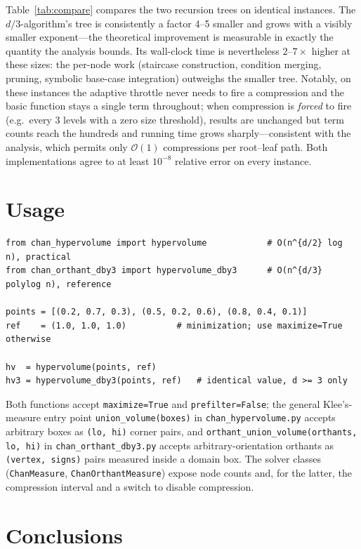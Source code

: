 \documentclass[11pt,a4paper]{article}
\theoremstyle{remark}
\newcommand{\Oh}{\mathcal{O}}
\begin{document}
Table~\ref{tab:compare} compares the two recursion trees on identical
instances.  The $d/3$-algorithm's tree is consistently a factor 4--5 smaller
and grows with a visibly smaller exponent---the theoretical improvement is
measurable in exactly the quantity the analysis bounds.  Its wall-clock time
is nevertheless $2$--$7\times$ higher at these sizes: the per-node work
(staircase construction, condition merging, pruning, symbolic base-case
integration) outweighs the smaller tree.  Notably, on these instances the
adaptive throttle never needs to fire a compression and the basic function
stays a single term throughout; when compression is \emph{forced} to fire
(e.g.\ every 3 levels with a zero size threshold), results are unchanged but
term counts reach the hundreds and running time grows sharply---consistent
with the analysis, which permits only $\Oh(1)$ compressions per root--leaf
path.  Both implementations agree to at least $10^{-8}$ relative error on
every instance.

\section{Usage}

\begin{lstlisting}
from chan_hypervolume import hypervolume            # O(n^{d/2} log n), practical
from chan_orthant_dby3 import hypervolume_dby3      # O(n^{d/3} polylog n), reference

points = [(0.2, 0.7, 0.3), (0.5, 0.2, 0.6), (0.8, 0.4, 0.1)]
ref    = (1.0, 1.0, 1.0)          # minimization; use maximize=True otherwise

hv  = hypervolume(points, ref)
hv3 = hypervolume_dby3(points, ref)   # identical value, d >= 3 only
\end{lstlisting}

\noindent Both functions accept \texttt{maximize=True} and
\texttt{prefilter=False}; the general Klee's-measure entry point
\texttt{union\_volume(boxes)} in \texttt{chan\_hypervolume.py} accepts
arbitrary boxes as \texttt{(lo, hi)} corner pairs, and
\texttt{orthant\_union\_volume(orthants, lo, hi)} in
\texttt{chan\_orthant\_dby3.py} accepts arbitrary-orientation orthants as
\texttt{(vertex, signs)} pairs measured inside a domain box.  The solver classes
(\texttt{ChanMeasure}, \texttt{ChanOrthantMeasure}) expose node counts and,
for the latter, the compression interval and a switch to disable compression.

\section{Conclusions}
\end{document}
